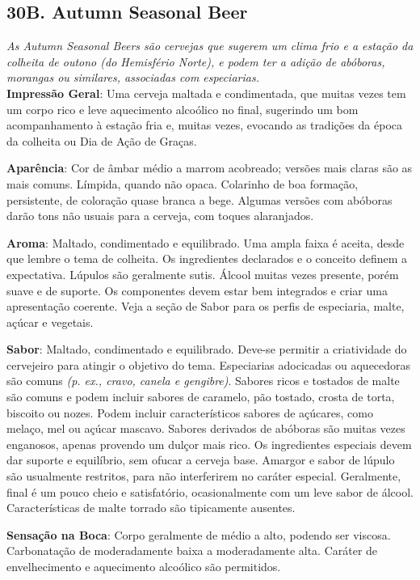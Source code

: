 \subsection*{30B. Autumn Seasonal Beer}
\textit{As Autumn Seasonal Beers são cervejas que sugerem um clima frio e a estação da colheita de outono (do Hemisfério Norte), e podem ter a adição de abóboras, morangas ou similares, associadas com especiarias.}\\
\textbf{Impressão Geral}: Uma cerveja maltada e condimentada, que muitas vezes tem um corpo rico e leve aquecimento alcoólico no final, sugerindo um bom acompanhamento à estação fria e, muitas vezes, evocando as tradições da época da colheita ou Dia de Ação de Graças.

\textbf{Aparência}: Cor de âmbar médio a marrom acobreado; versões mais claras são as mais comuns. Límpida, quando não opaca. Colarinho de boa formação, persistente, de coloração quase branca a bege. Algumas versões com abóboras darão tons não usuais para a cerveja, com toques alaranjados.

\textbf{Aroma}: Maltado, condimentado e equilibrado. Uma ampla faixa é aceita, desde que lembre o tema de colheita. Os ingredientes declarados e o conceito definem a expectativa. Lúpulos são geralmente sutis. Álcool muitas vezes presente, porém suave e de suporte. Os componentes devem estar bem integrados e criar uma apresentação coerente. Veja a seção de Sabor para os perfis de especiaria, malte, açúcar e vegetais.

\textbf{Sabor}: Maltado, condimentado e equilibrado. Deve-se permitir a criatividade do cervejeiro para atingir o objetivo do tema. Especiarias adocicadas ou aquecedoras são comuns \textit{(p. ex., cravo, canela e gengibre)}. Sabores ricos e tostados de malte são comuns e podem incluir sabores de caramelo, pão tostado, crosta de torta, biscoito ou nozes. Podem incluir característicos sabores de açúcares, como melaço, mel ou açúcar mascavo. Sabores derivados de abóboras são muitas vezes enganosos, apenas provendo um dulçor mais rico. Os ingredientes especiais devem dar suporte e equilíbrio, sem ofucar a cerveja base. Amargor e sabor de lúpulo são usualmente restritos, para não interferirem no caráter especial. Geralmente, final é um pouco cheio e satisfatório, ocasionalmente com um leve sabor de álcool. Características de malte torrado são tipicamente ausentes.

\textbf{Sensação na Boca}: Corpo geralmente de médio a alto, podendo ser viscosa. Carbonatação de moderadamente baixa a moderadamente alta. Caráter de envelhecimento e aquecimento alcoólico são permitidos.

